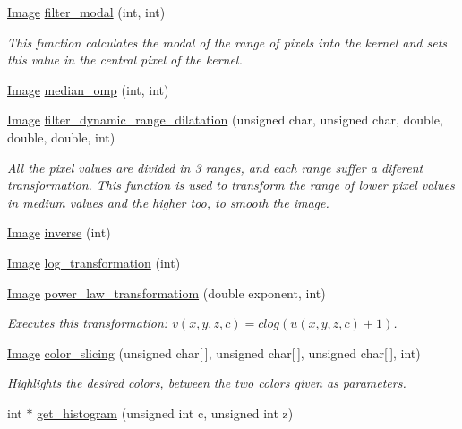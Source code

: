 \begin{DoxyCompactItemize}
\hyperlink{class_image}{Image} \hyperlink{class_image_ae67455a397b27c4a3bda96f3cc3e9d9f}{filter\-\_\-modal} (int, int)
\begin{DoxyCompactList}\small\item\em This function calculates the modal of the range of pixels into the kernel and sets this value in the central pixel of the kernel. \end{DoxyCompactList}\item 
\hyperlink{class_image}{Image} \hyperlink{class_image_af50c3c5a85c237f8b20af7dc4766c45d}{median\-\_\-omp} (int, int)
\item 
\hyperlink{class_image}{Image} \hyperlink{class_image_ae8dc7bd96987cf43f2b608f5f42bd8e3}{filter\-\_\-dynamic\-\_\-range\-\_\-dilatation} (unsigned char, unsigned char, double, double, double, int)
\begin{DoxyCompactList}\small\item\em All the pixel values are divided in 3 ranges, and each range suffer a diferent transformation. This function is used to transform the range of lower pixel values in medium values and the higher too, to smooth the image. \end{DoxyCompactList}\item 
\hyperlink{class_image}{Image} \hyperlink{class_image_a8a62778b8013b7f82ee74138678d5a24}{inverse} (int)
\item 
\hyperlink{class_image}{Image} \hyperlink{class_image_a23e96746fd7a360950a9588ca3fa466c}{log\-\_\-transformation} (int)
\item 
\hyperlink{class_image}{Image} \hyperlink{class_image_a4934472d3d78a5b26bc658cb6511c7e3}{power\-\_\-law\-\_\-transformatiom} (double exponent, int)
\begin{DoxyCompactList}\small\item\em Executes this transformation\-: $ v(x,y,z,c) = c log(u(x,y,z,c)+1)$. \end{DoxyCompactList}\item 
\hyperlink{class_image}{Image} \hyperlink{class_image_abad859b7de6c0237bdfeb0c41e754f6b}{color\-\_\-slicing} (unsigned char\mbox{[}$\,$\mbox{]}, unsigned char\mbox{[}$\,$\mbox{]}, unsigned char\mbox{[}$\,$\mbox{]}, int)
\begin{DoxyCompactList}\small\item\em Highlights the desired colors, between the two colors given as parameters. \end{DoxyCompactList}\item 
int $\ast$ \hyperlink{class_image_a36596e19076b920ec0b2c2aa9eee639c}{get\-\_\-histogram} (unsigned int c, unsigned int z)

\end{DoxyCompactItemize}
